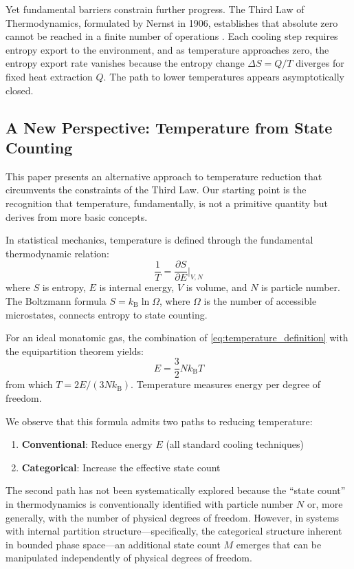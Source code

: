 \documentclass[twocolumn,10pt,twoside]{article}
\newcommand{\kb}{k_{\mathrm{B}}}
\begin{document}
Yet fundamental barriers constrain further progress. The Third Law of Thermodynamics, formulated by Nernst in 1906, establishes that absolute zero cannot be reached in a finite number of operations \cite{nernst1906,nernst1912}. Each cooling step requires entropy export to the environment, and as temperature approaches zero, the entropy export rate vanishes because the entropy change $\Delta S = Q/T$ diverges for fixed heat extraction $Q$. The path to lower temperatures appears asymptotically closed.

\subsection{A New Perspective: Temperature from State Counting}

This paper presents an alternative approach to temperature reduction that circumvents the constraints of the Third Law. Our starting point is the recognition that temperature, fundamentally, is not a primitive quantity but derives from more basic concepts.

In statistical mechanics, temperature is defined through the fundamental thermodynamic relation:
\begin{equation}
\frac{1}{T} = \frac{\partial S}{\partial E}\bigg|_{V,N}
\label{eq:temperature_definition}
\end{equation}
where $S$ is entropy, $E$ is internal energy, $V$ is volume, and $N$ is particle number. The Boltzmann formula $S = \kb \ln \Omega$, where $\Omega$ is the number of accessible microstates, connects entropy to state counting.

For an ideal monatomic gas, the combination of \eqref{eq:temperature_definition} with the equipartition theorem yields:
\begin{equation}
E = \frac{3}{2} N \kb T
\label{eq:equipartition}
\end{equation}
from which $T = 2E/(3N\kb)$. Temperature measures energy per degree of freedom.

We observe that this formula admits two paths to reducing temperature:
\begin{enumerate}
    \item \textbf{Conventional}: Reduce energy $E$ (all standard cooling techniques)
    \item \textbf{Categorical}: Increase the effective state count
\end{enumerate}

The second path has not been systematically explored because the ``state count'' in thermodynamics is conventionally identified with particle number $N$ or, more generally, with the number of physical degrees of freedom. However, in systems with internal partition structure---specifically, the categorical structure inherent in bounded phase space---an additional state count $M$ emerges that can be manipulated independently of physical degrees of freedom.
\end{document}
